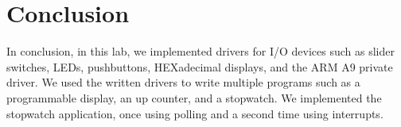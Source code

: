 \documentclass[10pt]{article}
\begin{document}
\section{Conclusion}
In conclusion, in this lab, we implemented drivers for I/O devices such as slider switches, LEDs, pushbuttons, HEXadecimal displays, and the ARM A9 private driver. We used the written drivers to write multiple programs such as a programmable display, an up counter, and a stopwatch. We implemented the stopwatch application, once using polling and a second time using interrupts.
\end{document}
